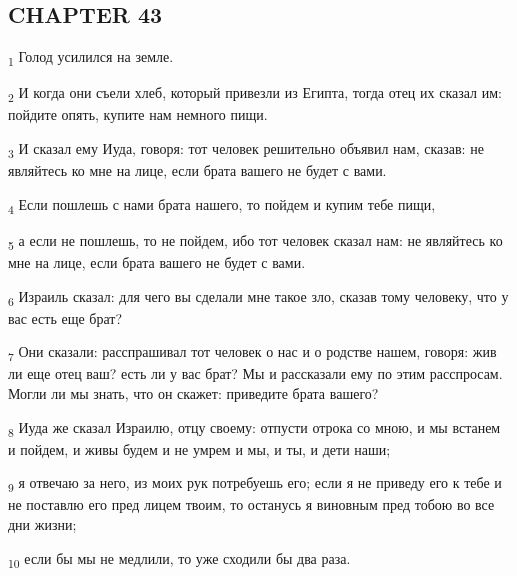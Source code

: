 \subsection{CHAPTER 43}
\begin{tcolorbox}
\textsubscript{1} Голод усилился на земле.
\end{tcolorbox}
\begin{tcolorbox}
\textsubscript{2} И когда они съели хлеб, который привезли из Египта, тогда отец их сказал им: пойдите опять, купите нам немного пищи.
\end{tcolorbox}
\begin{tcolorbox}
\textsubscript{3} И сказал ему Иуда, говоря: тот человек решительно объявил нам, сказав: не являйтесь ко мне на лице, если брата вашего не будет с вами.
\end{tcolorbox}
\begin{tcolorbox}
\textsubscript{4} Если пошлешь с нами брата нашего, то пойдем и купим тебе пищи,
\end{tcolorbox}
\begin{tcolorbox}
\textsubscript{5} а если не пошлешь, то не пойдем, ибо тот человек сказал нам: не являйтесь ко мне на лице, если брата вашего не будет с вами.
\end{tcolorbox}
\begin{tcolorbox}
\textsubscript{6} Израиль сказал: для чего вы сделали мне такое зло, сказав тому человеку, что у вас есть еще брат?
\end{tcolorbox}
\begin{tcolorbox}
\textsubscript{7} Они сказали: расспрашивал тот человек о нас и о родстве нашем, говоря: жив ли еще отец ваш? есть ли у вас брат? Мы и рассказали ему по этим расспросам. Могли ли мы знать, что он скажет: приведите брата вашего?
\end{tcolorbox}
\begin{tcolorbox}
\textsubscript{8} Иуда же сказал Израилю, отцу своему: отпусти отрока со мною, и мы встанем и пойдем, и живы будем и не умрем и мы, и ты, и дети наши;
\end{tcolorbox}
\begin{tcolorbox}
\textsubscript{9} я отвечаю за него, из моих рук потребуешь его; если я не приведу его к тебе и не поставлю его пред лицем твоим, то останусь я виновным пред тобою во все дни жизни;
\end{tcolorbox}
\begin{tcolorbox}
\textsubscript{10} если бы мы не медлили, то уже сходили бы два раза.
\end{tcolorbox}
